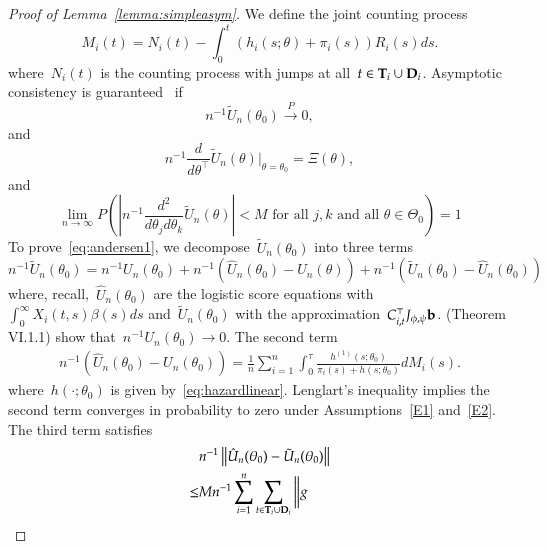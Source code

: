 \documentclass[12pt]{amsart}
\def\bfT{{\bf T}}
\def\bfD{{\bf D}}
\begin{document}
\begin{proof}[Proof of Lemma~\ref{lemma:simpleasym}]
We define the joint counting process
\[
M_i (t) = N_i (t) - \int_0^t (h_i (s; \theta) + \pi_i (s)) R_i (s) ds.
\]
where~$N_i (t)$ is the counting process with jumps at all~$t \in \bfT_i \cup \bfD_i$. Asymptotic consistency is guaranteed~\cite[Theorem VI.1.1]{Andersen1993} if
\begin{equation}
\label{eq:andersen1}
n^{-1} \tilde U_n (\theta_0 ) \overset{P}{\to} 0,
\end{equation}
and
\begin{equation}
\label{eq:andersen2}
n^{-1} \frac{d}{d \theta^{\top}} \tilde U_n (\theta) \big |_{\theta =
  \theta_0} = \Xi (\theta),
\end{equation}
and
\begin{equation}
\label{eq:andersen3}
\lim_{n \to \infty} P \left( \left | n^{-1} \frac{d^2}{d \theta_j d
      \theta_k} \tilde U_n (\theta) \right | < M \text{ for all }
  j,k \text{ and all } \theta \in \Theta_0 \right) = 1
\end{equation}
To prove~\eqref{eq:andersen1}, we decompose~$\tilde U_n (\theta_0)$ into
three terms
\[
n^{-1} \tilde U_n (\theta_0) = n^{-1} U_n (\theta_0 )  + n^{-1} \left(
  \hat U_n (\theta_0) - U_n (\theta) \right) + n^{-1} \left(\tilde U_n
  (\theta_0) - \hat U_n (\theta_0) \right)
\]
where, recall,~$\hat U_n (\theta_0)$ are the logistic score equations with $\int_0^\infty X_i(t,s) \beta(s) ds$ and~$\tilde U_n (\theta_0)$ with the approximation~$C_{i,t}^\top J_{\phi, \psi} {\bf b}$. \cite{Andersen1993} (Theorem VI.1.1) show that~$n^{-1} U_n (\theta_0)
\to 0$. The second term
\begin{align*}
n^{-1} \left( \hat U_n (\theta_0) - U_n (\theta_0) \right) =
  \frac{1}{n} \sum_{i=1}^n \int_0^{\tau} \frac{h^{(1)} (s;
  \theta_0)}{\pi_i (s) + h (s;\theta_0)} d M_i (s).
\end{align*}
where~$h(\cdot; \theta_0)$ is given by~\eqref{eq:hazardlinear}. Lenglart's inequality implies the second term converges in probability to zero under Assumptions~\ref{E1} and~\ref{E2}. The third term satisfies
\begin{align*}
  &n^{-1} \left \| \hat U_n (\theta_0) - \tilde U_n (\theta_0) \right \| \\
  \leq & M n^{-1} \sum_{i=1}^n \sum_{t \in \bfT_i \cup \bfD_i} \bigg \| g

\end{align*}
\end{proof}
\end{document}
